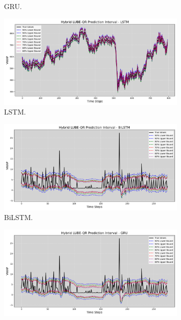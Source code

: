 \begin{figure}[H]
\begin{minipage}{0.49\textwidth}
\begin{subfigure}[b]{\textwidth}
            \caption{GRU.}
        \end{subfigure}
        \begin{subfigure}[b]{\textwidth}
            \centering
            \includegraphics[width=\textwidth]{Chap03/figs/Hybrid_LUBE_QR_AllConfidence_axisbank_LSTM.png}
            \caption{LSTM.}
        \end{subfigure}
        \caption{Prediction Intervals for Axis Bank dataset obtained using proposed LUBE-QR based Hybrid Method and (a) BiLSTM, (b) CNN, (c) GRU, (d) LSTM Models respectively.}
        \label{fig 5.3}
    \end{minipage}
    \hfill
    \begin{minipage}{0.49\textwidth}
        \centering
        \begin{subfigure}[b]{\textwidth}
            \centering
            \includegraphics[width=\textwidth]{Chap03/figs/Hybrid_LUBE_QR_AllConfidence_elec_consumption_BiLSTM.png}
            \caption{BiLSTM.}
        \end{subfigure}
        \hfill
        \begin{subfigure}[b]{\textwidth}
            \centering
            \includegraphics[width=\textwidth]{Chap03/figs/Hybrid_LUBE_QR_AllConfidence_elec_consumption_GRU.png}

\end{subfigure}
\end{minipage}
\end{figure}
